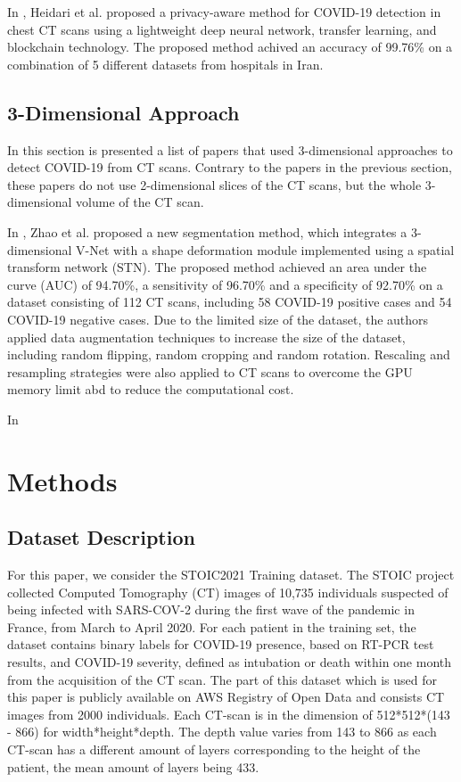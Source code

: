 \documentclass[12pt, letterpaper]{article}
\begin{document}
In \cite{Heidari_2022}, Heidari et al. proposed a privacy-aware method for COVID-19 detection in chest CT scans using a lightweight deep neural network, transfer learning, and blockchain technology. The proposed method achived an accuracy of 99.76\% on a combination of 5 different datasets from hospitals in Iran.

\subsection{3-Dimensional Approach}
In this section is presented a list of papers that used 3-dimensional approaches to detect COVID-19 from CT scans. Contrary to the papers in the previous section, these papers do not use 2-dimensional slices of the CT scans, but the whole 3-dimensional volume of the CT scan. 

In \cite{Zhao_2021}, Zhao et al. proposed a new segmentation method, which integrates a 3-dimensional V-Net with a shape deformation module implemented using a spatial transform network (STN). The proposed method achieved an area under the curve (AUC) of 94.70\%, a sensitivity of 96.70\% and a specificity of 92.70\% on a dataset consisting of 112 CT scans, including 58 COVID-19 positive cases and 54 COVID-19 negative cases. Due to the limited size of the dataset, the authors applied data augmentation techniques to increase the size of the dataset, including random flipping, random cropping and random rotation. Rescaling and resampling strategies were also applied to CT scans to overcome the GPU memory limit abd to reduce the computational cost.

In \cite{Pu_2020}

\newpage
\section{Methods}

\subsection{Dataset Description}
For this paper, we consider the STOIC2021 Training dataset. The STOIC project collected Computed Tomography (CT) images of 10,735 individuals suspected of being infected with SARS-COV-2 during the first wave of the pandemic in France, from March to April 2020. For each patient in the training set, the dataset contains binary labels for COVID-19 presence, based on RT-PCR test results, and COVID-19 severity, defined as intubation or death within one month from the acquisition of the CT scan\cite{Revel_2021}. The part of this dataset which is used for this paper is publicly available on AWS Registry of Open Data \cite{STOIC_Training} and consists CT images from 2000 individuals. Each CT-scan is in the dimension of 512*512*(143 - 866) for width*height*depth. The depth value varies from 143 to 866 as each CT-scan has a different amount of layers corresponding to the height of the patient, the mean amount of layers being 433.
\end{document}
